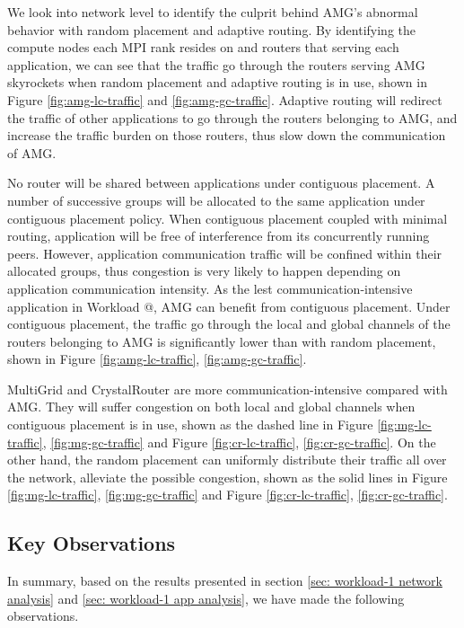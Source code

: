 \documentclass[conference,compsoc]{IEEEtran}
\makeatletter
\newcommand{\Rmnum}[1]{\expandafter\@slowromancap\romannumeral #1@}
\makeatother
\begin{document}
We look into network level to identify the culprit behind AMG's abnormal behavior with random placement and adaptive routing. By identifying the compute nodes each MPI rank resides on and routers that serving each application, we can see that the traffic go through the routers serving AMG skyrockets when random placement and adaptive routing is in use, shown in Figure \ref{fig:amg-lc-traffic} and \ref{fig:amg-gc-traffic}. Adaptive routing will redirect the traffic of other applications to go through the routers belonging to AMG, and increase the traffic burden on those routers, thus slow down the communication of AMG.

No router will be shared between applications under contiguous placement. A number of successive groups will be allocated to the same application under contiguous placement policy. When contiguous placement coupled with minimal routing, application will be free of interference from its concurrently running peers. However, application communication traffic will be confined within their allocated groups, thus congestion is very likely to happen depending on application communication intensity. As the lest communication-intensive application in Workload \Rmnum{1}, AMG can benefit from contiguous placement. Under contiguous placement, the traffic go through the local and global channels of the routers belonging to AMG is significantly lower than with random placement, shown in Figure \ref{fig:amg-lc-traffic}, \ref{fig:amg-gc-traffic}. 

MultiGrid and CrystalRouter are more communication-intensive compared with AMG. They will suffer congestion on both local and global channels when contiguous placement is in use, shown as the dashed line in Figure \ref{fig:mg-lc-traffic}, \ref{fig:mg-gc-traffic} and Figure \ref{fig:cr-lc-traffic}, \ref{fig:cr-gc-traffic}. On the other hand, the random placement can uniformly distribute their traffic all over the network, alleviate the possible congestion, shown as the solid lines in Figure \ref{fig:mg-lc-traffic}, \ref{fig:mg-gc-traffic} and Figure \ref{fig:cr-lc-traffic}, \ref{fig:cr-gc-traffic}.


\subsection{Key Observations}
In summary, based on the results presented in section \ref{sec: workload-1 network analysis} and \ref{sec: workload-1 app analysis}, we have made the following observations.
\end{document}
